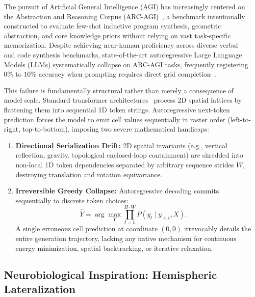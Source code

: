 \documentclass[11pt,a4paper]{article}
\theoremstyle{plain}
\theoremstyle{definition}
\theoremstyle{remark}
\begin{document}
The pursuit of Artificial General Intelligence (AGI) has increasingly centered on the Abstraction and Reasoning Corpus (ARC-AGI)~\cite{chollet2019arc}, a benchmark intentionally constructed to evaluate few-shot inductive program synthesis, geometric abstraction, and core knowledge priors without relying on vast task-specific memorization. Despite achieving near-human proficiency across diverse verbal and code synthesis benchmarks, state-of-the-art autoregressive Large Language Models (LLMs) systematically collapse on ARC-AGI tasks, frequently registering $0\%$ to $10\%$ accuracy when prompting requires direct grid completion~\cite{greenblatt2024arc,wang2025hrm}. 

This failure is fundamentally structural rather than merely a consequence of model scale. Standard transformer architectures~\cite{vaswani2017attention} process 2D spatial lattices by flattening them into sequential 1D token strings. Autoregressive next-token prediction forces the model to emit cell values sequentially in raster order (left-to-right, top-to-bottom), imposing two severe mathematical handicaps:
\begin{enumerate}
    \item \textbf{Directional Serialization Drift:} 2D spatial invariants (e.g., vertical reflection, gravity, topological enclosed-loop containment) are shredded into non-local 1D token dependencies separated by arbitrary sequence strides $W$, destroying translation and rotation equivariance.
    \item \textbf{Irreversible Greedy Collapse:} Autoregressive decoding commits sequentially to discrete token choices:
    \begin{equation}
        \hat{Y} = \arg\max_{Y} \prod_{t=1}^{H \cdot W} P(y_t \mid y_{<t}, X).
    \end{equation}
    A single erroneous cell prediction at coordinate $(0, 0)$ irrevocably derails the entire generation trajectory, lacking any native mechanism for continuous energy minimization, spatial backtracking, or iterative relaxation.
\end{enumerate}

\subsection{Neurobiological Inspiration: Hemispheric Lateralization}
\end{document}

